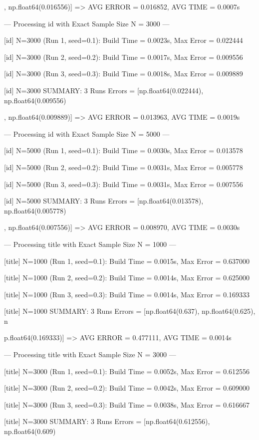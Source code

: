\documentclass[11pt,a4paper]{article}
\begin{document}
, np.float64(0.016556)] => AVG ERROR = 0.016852, AVG TIME = 0.0007s

--- Processing id with Exact Sample Size N = 3000 ---

[id] N=3000 (Run 1, seed=0.1): Build Time = 0.0023s, Max Error = 0.022444

[id] N=3000 (Run 2, seed=0.2): Build Time = 0.0017s, Max Error = 0.009556

[id] N=3000 (Run 3, seed=0.3): Build Time = 0.0018s, Max Error = 0.009889

[id] N=3000 SUMMARY: 3 Runs Errors = [np.float64(0.022444), np.float64(0.009556)

, np.float64(0.009889)] => AVG ERROR = 0.013963, AVG TIME = 0.0019s

--- Processing id with Exact Sample Size N = 5000 ---

[id] N=5000 (Run 1, seed=0.1): Build Time = 0.0030s, Max Error = 0.013578

[id] N=5000 (Run 2, seed=0.2): Build Time = 0.0031s, Max Error = 0.005778

[id] N=5000 (Run 3, seed=0.3): Build Time = 0.0031s, Max Error = 0.007556

[id] N=5000 SUMMARY: 3 Runs Errors = [np.float64(0.013578), np.float64(0.005778)

, np.float64(0.007556)] => AVG ERROR = 0.008970, AVG TIME = 0.0030s

--- Processing title with Exact Sample Size N = 1000 ---

[title] N=1000 (Run 1, seed=0.1): Build Time = 0.0015s, Max Error = 0.637000

[title] N=1000 (Run 2, seed=0.2): Build Time = 0.0014s, Max Error = 0.625000

[title] N=1000 (Run 3, seed=0.3): Build Time = 0.0014s, Max Error = 0.169333

[title] N=1000 SUMMARY: 3 Runs Errors = [np.float64(0.637), np.float64(0.625), n

p.float64(0.169333)] => AVG ERROR = 0.477111, AVG TIME = 0.0014s

--- Processing title with Exact Sample Size N = 3000 ---

[title] N=3000 (Run 1, seed=0.1): Build Time = 0.0052s, Max Error = 0.612556

[title] N=3000 (Run 2, seed=0.2): Build Time = 0.0042s, Max Error = 0.609000

[title] N=3000 (Run 3, seed=0.3): Build Time = 0.0038s, Max Error = 0.616667

[title] N=3000 SUMMARY: 3 Runs Errors = [np.float64(0.612556), np.float64(0.609)
\end{document}
